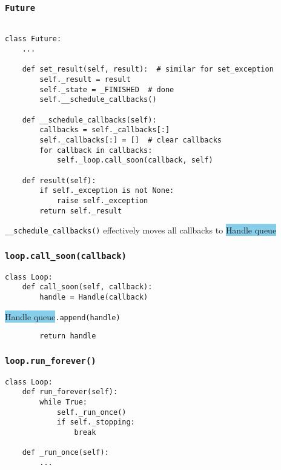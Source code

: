\documentclass[compress,usenames,dvipsnames]{beamer}
\begin{document}
\begin{frame}
    \frametitle{\lstinline{Future}}
    \scriptsize
    \begin{lstlisting}

class Future:
    ...

    def set_result(self, result):  # similar for set_exception
        self._result = result
        self._state = _FINISHED  # done
        self.__schedule_callbacks()

    def __schedule_callbacks(self):
        callbacks = self._callbacks[:]
        self._callbacks[:] = []  # clear callbacks
        for callback in callbacks:
            self._loop.call_soon(callback, self)

    def result(self):
        if self._exception is not None:
            raise self._exception
        return self._result
    \end{lstlisting}
\lstinline{__schedule_callbacks()} effectively moves all callbacks to \colorbox{SkyBlue}{Handle queue}
\end{frame}

\begin{frame}
    \frametitle{\lstinline{loop.call_soon(callback)}}
    \begin{lstlisting}
class Loop:
    def call_soon(self, callback):
        handle = Handle(callback)
    \end{lstlisting}
 \colorbox{SkyBlue}{Handle queue}\lstinline{.append(handle)}
    \begin{lstlisting}
        return handle
    \end{lstlisting}
\end{frame}

\begin{frame}
    \frametitle{\lstinline{loop.run_forever()}}
    \begin{lstlisting}
class Loop:
    def run_forever(self):
        while True:
            self._run_once()
            if self._stopping:
                break

    def _run_once(self):
        ...
    \end{lstlisting}
\end{frame}
\end{document}
